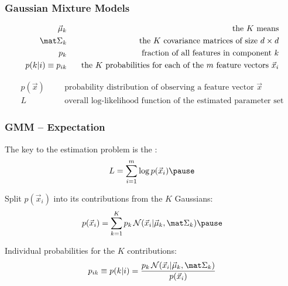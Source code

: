 \begin{frame}
  \frametitle{Gaussian Mixture Models \cont}

%  
  \begin{eqnarray*}
    \vec\mu_k            &\phantom{=}& \mbox{the $K$ means} \\
    \mat\Sigma_k         &\phantom{=}& \mbox{the $K$ covariance matrices of size $d \times d$} \\
    p_k                  &\phantom{=}& \mbox{fraction of all features in component $k$} \\
    p(k|i) \equiv p_{ik} &\phantom{=}& \mbox{the $K$ probabilities for each of the $m$ feature vectors $\vec{x}_i$}
  \end{eqnarray*}  
  \pspread

%  
  \begin{eqnarray*}
    p(\vec x) &\phantom{=}& \mbox{probability distribution of observing a feature vector $\vec x$} \\
    L         &\phantom{=}& \mbox{overall log-likelihood function of the estimated parameter set}
  \end{eqnarray*}
\end{frame}


\begin{frame}
  \frametitle{GMM -- Expectation}
  
  The key to the estimation problem is the :
  \begin{displaymath}
    L = \sum_{i = 1}^{m} \log p(\vec x_i) \pause
  \end{displaymath}
  
  Split $p(\vec x_i)$ %
  into its contributions from the $K$ Gaussians:
  \begin{displaymath}
    p(\vec x_i) = \sum_{k=1}^{K} p_k \, {\mathcal N}(\vec x_i | \vec \mu_k, \mat \Sigma_k) \pause
  \end{displaymath}

  Individual probabilities for the $K$ contributions:
  \begin{displaymath}
    p_{ik} \equiv p(k|i) = \frac{ p_k\,{\mathcal N}(\vec x_i | \vec \mu_k, \mat \Sigma_k)}{p(\vec x_i)}
  \end{displaymath}
\end{frame}


